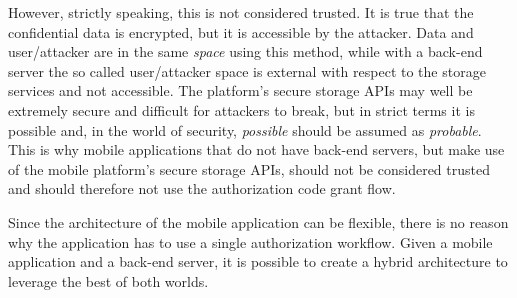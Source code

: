 However, strictly speaking, this is not considered trusted. It is true that the confidential data is encrypted, but it is accessible by the attacker. Data and user/attacker are in the same \textit{space} using this method, while with a back-end server the so called user/attacker space is external with respect to the storage services and not accessible. The platform's secure storage APIs may well be extremely secure and difficult for attackers to break, but in strict terms it is possible and, in the world of security, \textit{possible} should be assumed as \textit{probable}. This is why mobile applications that do not have back-end servers, but make use of the mobile platform's secure storage APIs, should not be considered trusted and should therefore not use the authorization code grant flow.

Since the architecture of the mobile application can be flexible, there is no reason why the application has to use a single authorization workflow. Given a mobile application and a back-end server, it is possible to create a hybrid architecture to leverage the best of both worlds.